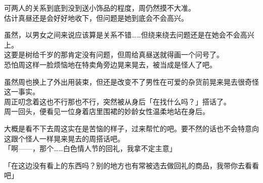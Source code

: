 可两人的关系到底到没到送小饰品的程度，周仍然摸不大准。\\

估计真昼还是会好好地收下，但问题是她到底会不会高兴。

虽然，以男女之间来说应该算是关系不错……但绕来绕去问题还是在她会不会高兴上。\\

这要是树给千岁的那肯定没有问题，但周给真昼送就得画一个问号了。\\

恐怕周这样一脸烦恼地在特卖角旁边晃来晃去，被当成是怪人了吧。

虽然周也换上了外出用装束，但还是改变不了男性在可爱的杂货前晃来晃去很奇怪这一事实。\\

周正叨念着这也不行那也不行，突然被从身后「在找什么吗？」搭话了。\\

周一回头，便看见一位身着店里围裙的妙龄女性温柔地站在身后。

大概是看不下去周这实在是苦恼的样子，过来帮忙的吧。要不然的话也不会特意向这跟个怪人一样晃来晃去的周搭话吧。\\

「啊——，那个……白色情人节的回礼，我拿不定主意」

「在这边没有看上的东西吗？别的地方也有常被选去做回礼的商品，我带你去看看吧」

